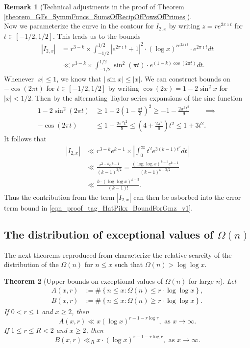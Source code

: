\documentclass[11pt,reqno,a4letter]{article}
\numberwithin{figure}{section}
\numberwithin{table}{section}
\theoremstyle{plain}
\newtheorem{theorem}{Theorem}
\numberwithin{theorem}{section}
\theoremstyle{definition}
\newtheorem{remark}[theorem]{Remark}
\begin{document}
\begin{remark}[Technical adjustments in the proof of Theorem \ref{theorem_GFs_SymmFuncs_SumsOfRecipOfPowsOfPrimes}]
\[\] 
Now we parameterize the curve in the contour for $I_{2,x}$ by writing 
$z = re^{2\pi\imath t}$ for $t \in [-1/2, 1/2]$. This leads us to the bounds 
\begin{align*} 
|I_{2,x}| & = r^{3-k} \times \int_{-1/2}^{1/2} |e^{2\pi\imath t} + 1|^2 \cdot 
     (\log x)^{r e^{2\pi\imath t}} \cdot e^{2\pi\imath t} dt \\ 
     & \ll r^{3-k} \times \int_{-1/2}^{1/2} \sin^2(\pi t) \cdot 
     e^{(1-k) \cos(2\pi t)} dt. 
\end{align*} 
Whenever $|x| \leq 1$, we know that $|\sin x| \leq |x|$. 
We can construct bounds on $-\cos(2\pi t)$ for 
$t \in [-1/2, 1/2]$ by writing $\cos(2x) = 1 - 2\sin^2 x$ for $|x| < 1/2$. 
Then by the alternating Taylor series expansions of the sine function 
\begin{align*} 
1-2\sin^2(2\pi t) & \geq 1 - 2 \left(1 - \frac{\pi t}{3}\right)^2 \geq -1 - \frac{2\pi^2 t^2}{9} 
     \qquad \implies \\ 
-\cos(2\pi t) & \leq 1 + \frac{2\pi^2 t^2}{9} \leq \left(4 + \frac{2\pi^2}{9}\right) t^2 \leq 1 + 3t^2. 
\end{align*} 
It follows that 
\begin{align*} 
|I_{2,x}| & \ll r^{3-k} e^{k-1} \times \left\lvert \int_0^{\infty} t^2 e^{3(k-1) t^2} dt 
     \right\rvert \\ 
     & \ll \frac{r^{3-k} e^{k-1}}{(k-1)^{3/2}} = \frac{(\log\log x)^{k-3} e^{k-1}}{(k-1)^{k-3/2}} \\ 
     & \ll \frac{k \cdot (\log\log x)^{k-3}}{(k-1)!}. 
\end{align*} 
Thus the contribution from the term $|I_{2,x}|$ can then be asborbed into the error term bound 
in \eqref{eqn_proof_tag_HatPikx_BoundForGmz_v1}. 
\end{remark} 

\subsection{The distribution of exceptional values of $\Omega(n)$} 

The next theorems reproduced from \cite[\S 7.4]{MV} characterize the relative 
scarcity of the distribution of the $\Omega(n)$ for $n \leq x$ such that 
$\Omega(n) > \log\log x$. 

\begin{theorem}[Upper bounds on exceptional values of $\Omega(n)$ for large $n$] 
\label{theorem_MV_Thm7.20-init_stmt} 
Let 
\begin{align*} 
A(x, r) & := \#\left\{n \leq x: \Omega(n) \leq r \cdot \log\log x\right\}, \\ 
B(x, r) & := \#\left\{n \leq x: \Omega(n) \geq r \cdot \log\log x\right\}. 
\end{align*} 
If $0 < r \leq 1$ and $x \geq 2$, then 
\[
A(x, r) \ll x (\log x)^{r-1 - r\log r}, \text{ \ as\ } x \rightarrow \infty. 
\]
If $1 \leq r \leq R < 2$ and $x \geq 2$, then 
\[
B(x, r) \ll_R x \cdot (\log x)^{r-1-r \log r}, \text{ \ as\ } x \rightarrow \infty. 
\]
\end{theorem} 
\end{document}
